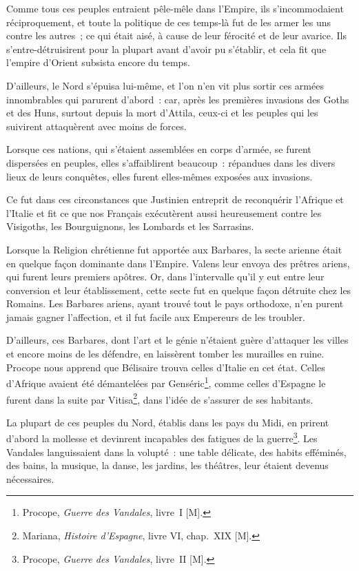 \documentclass[french,twoside]{book} %
\newcommand\chaptercont{} %
\begin{document}
\chaptercont
\noindent Comme tous ces peuples entraient pêle-mêle dans l’Empire, ils s’incommodaient réciproquement, et toute la politique de ces temps-là fut de les armer les uns contre les autres ; ce qui était aisé, à cause de leur férocité et de leur avarice. Ils s’entre-détruisirent pour la plupart avant d’avoir pu s’établir, et cela fit que l’empire d’Orient subsista encore du temps.\par
D’ailleurs, le Nord s’épuisa lui-même, et l’on n’en vit plus sortir ces armées innombrables qui parurent d’abord : car, après les premières invasions des Goths et des Huns, surtout depuis la mort d’Attila, ceux-ci et les peuples qui les suivirent attaquèrent avec moins de forces.\par
Lorsque ces nations, qui s’étaient assemblées en corps d’armée, se furent dispersées en peuples, elles s’affaiblirent beaucoup : répandues dans les divers lieux de leurs conquêtes, elles furent elles-mêmes exposées aux invasions.\par
Ce fut dans ces circonstances que Justinien entreprit de reconquérir l’Afrique et l’Italie et fit ce que nos Français exécutèrent aussi heureusement contre les Visigoths, les Bourguignons, les Lombards et les Sarrasins.\par
Lorsque la Religion chrétienne fut apportée aux Barbares, la secte arienne était en quelque façon dominante dans l’Empire. Valens leur envoya des prêtres ariens, qui furent leurs premiers apôtres. Or, dans l’intervalle qu’il y eut entre leur conversion et leur établissement, cette secte fut en quelque façon détruite chez les Romains. Les Barbares ariens, ayant trouvé tout le pays orthodoxe, n’en purent jamais gagner l’affection, et il fut facile aux Empereurs de les troubler.\par
D’ailleurs, ces Barbares, dont l’art et le génie n’étaient guère d’attaquer les villes et encore moins de les défendre, en laissèrent tomber les murailles en ruine. Procope nous apprend que Bélisaire trouva celles d’Italie en cet état. Celles d’Afrique avaient été démantelées par Genséric\footnote{Procope, {\itshape Guerre des Vandales}, livre I [M].}, comme celles d’Espagne le furent dans la suite par Vitisa\footnote{Mariana, {\itshape Histoire d’Espagne}, livre VI, chap. XIX [M].}, dans l’idée de s’assurer de ses habitants.\par
La plupart de ces peuples du Nord, établis dans les pays du Midi, en prirent d’abord la mollesse et devinrent incapables des fatigues de la guerre\footnote{Procope, {\itshape Guerre des Vandales}, livre II [M].}. Les Vandales languissaient dans la volupté : une table délicate, des habits efféminés, des bains, la musique, la danse, les jardins, les théâtres, leur étaient devenus nécessaires.\par
\end{document}
